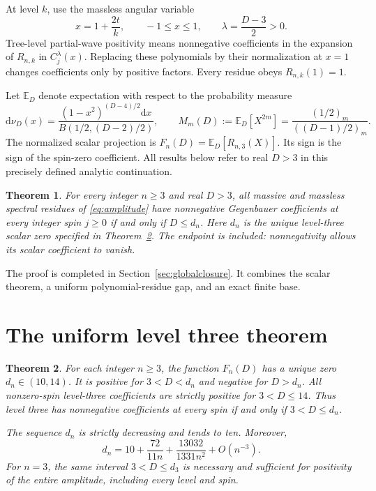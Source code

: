 \documentclass[11pt,a4paper]{article}
\newtheorem{theorem}{Theorem}[section]
\theoremstyle{remark}\newtheorem{remark}[theorem]{Remark}
\newcommand{\E}{\mathbb E}
\newcommand{\dd}{\mathrm d}
\begin{document}
At level $k$, use the massless angular variable
\begin{equation}\label{eq:angle}
 x=1+\frac{2t}{k},\qquad -1\leq x\leq1,
 \qquad \lambda=\frac{D-3}{2}>0.
\end{equation}
Tree-level partial-wave positivity means nonnegative coefficients in the expansion of $R_{n,k}$ in $C_j^\lambda(x)$. Replacing these polynomials by their normalization at $x=1$ changes coefficients only by positive factors. Every residue obeys $R_{n,k}(1)=1$.

Let $\E_D$ denote expectation with respect to the probability measure
\begin{equation}\label{eq:beta}
 \dd\nu_D(x)=\frac{(1-x^2)^{(D-4)/2}\dd x}
 {B(1/2,(D-2)/2)},\qquad
 M_m(D):=\E_D[X^{2m}]=\frac{(1/2)_m}{((D-1)/2)_m}.
\end{equation}
The normalized scalar projection is $F_n(D)=\E_D[R_{n,3}(X)]$. Its sign is the sign of the spin-zero coefficient. All results below refer to real $D>3$ in this precisely defined analytic continuation.

\begin{theorem}\label{thm:global}
For every integer $n\geq3$ and real $D>3$, all massive and massless spectral residues of \eqref{eq:amplitude} have nonnegative Gegenbauer coefficients at every integer spin $j\geq0$ if and only if $D\leq d_n$. Here $d_n$ is the unique level-three scalar zero specified in Theorem~\ref{thm:main}. The endpoint is included: nonnegativity allows its scalar coefficient to vanish.
\end{theorem}
The proof is completed in Section~\ref{sec:globalclosure}. It combines the scalar theorem, a uniform polynomial-residue gap, and an exact finite base.


\section{The uniform level three theorem}
\begin{theorem}\label{thm:main}
For each integer $n\geq3$, the function $F_n(D)$ has a unique zero $d_n\in(10,14)$. It is positive for $3<D<d_n$ and negative for $D>d_n$. All nonzero-spin level-three coefficients are strictly positive for $3<D\leq14$. Thus level three has nonnegative coefficients at every spin if and only if $3<D\leq d_n$.

The sequence $d_n$ is strictly decreasing and tends to ten. Moreover,
\begin{equation}\label{eq:asymptotic}
 d_n=10+\frac{72}{11n}+\frac{13032}{1331n^2}+O(n^{-3}).
\end{equation}
For $n=3$, the same interval $3<D\leq d_3$ is necessary and sufficient for positivity of the entire amplitude, including every level and spin.
\end{theorem}
\end{document}
